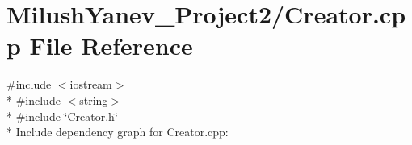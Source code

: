 \section{Milush\+Yanev\+\_\+\+Project2/\+Creator.cpp File Reference}
\label{_creator_8cpp}
{\ttfamily \#include $<$iostream$>$}\\*
{\ttfamily \#include $<$string$>$}\\*
{\ttfamily \#include \char`\"{}Creator.\+h\char`\"{}}\\*
Include dependency graph for Creator.\+cpp\+:
